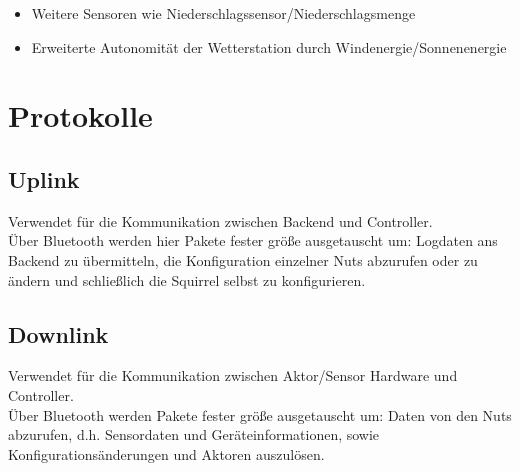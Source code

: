 \documentclass[12pt,a4paper]{article}
\begin{document}
\begin{itemize}
	\item Weitere Sensoren wie Niederschlagssensor/Niederschlagsmenge
	\item Erweiterte Autonomität der Wetterstation durch Windenergie/Sonnenenergie
\end{itemize}

\section{Protokolle}

\subsection{Uplink}
\label{subsec:uplink}


Verwendet für die Kommunikation zwischen Backend und Controller.\\
Über Bluetooth werden hier Pakete fester größe ausgetauscht um: Logdaten ans Backend zu übermitteln, die Konfiguration einzelner Nuts abzurufen oder zu ändern und schließlich die Squirrel selbst zu konfigurieren.

\subsection{Downlink}
\label{subsec:downlink}

Verwendet für die Kommunikation zwischen Aktor/Sensor Hardware und Controller.\\
Über Bluetooth werden Pakete fester größe ausgetauscht um: Daten von den Nuts abzurufen, d.h. Sensordaten und Geräteinformationen, sowie Konfigurationsänderungen und Aktoren auszulösen. 
\end{document}
